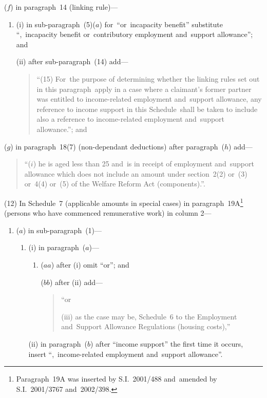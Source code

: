 \documentclass[12pt,a4paper]{article}
\begin{document}
\begin{enumerate}
($f$) in paragraph~14 (linking rule)—
\begin{enumerate}\item[]
(i) in sub-paragraph~(5)($a$)  for~“or~incapacity benefit” substitute “,~incapacity benefit or~contributory employment and~support allowance”; and

(ii) after sub-paragraph~(14) add—
\begin{quotation}
“(15) For~the purpose of determining whether the linking rules set out in this paragraph~apply in a case where a claimant’s former partner was entitled to income-related employment and~support allowance, any reference to income support in this Schedule~shall be taken to include also a reference to income-related employment and~support allowance.”; and
\end{quotation}
\end{enumerate}

($g$) in paragraph~18(7) (non-dependant deductions) after paragraph~($h$)  add—
\begin{quotation}
“($i$) he is aged less than 25 and~is in receipt of employment and~support allowance which does not include an amount under section~2(2) or~(3) or~4(4) or~(5) of the Welfare Reform Act (components).”.
\end{quotation}
\end{enumerate}

(12) In Schedule~7 (applicable amounts in special cases) in paragraph~19A\footnote{Paragraph~19A was inserted by S.I.~2001/488 and~amended by S.I.~2001/3767 and~2002/398.} (persons who have commenced remunerative work) in column 2—
\begin{enumerate}\item[]
($a$) in sub-paragraph~(1)—
\begin{enumerate}\item[]
(i) in paragraph~($a$)—
\begin{enumerate}\item[]
($aa$) after (i)  omit “or”; and

($bb$) after (ii)  add—
\begin{quotation}
“or

(iii) as the case may be, Schedule~6 to the Employment and~Support Allowance Regulations (housing costs),”
\end{quotation}
\end{enumerate}

(ii) in paragraph~($b$)  after “income support” the first time it occurs, insert “,~income-related employment and~support allowance”.
\end{enumerate}
\end{enumerate}
\end{document}

